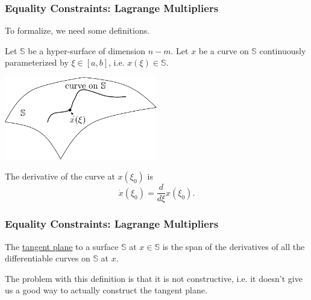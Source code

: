 \documentclass{beamer}
\begin{document}
\begin{frame}\frametitle{Equality Constraints: Lagrange Multipliers}
	To formalize, we need some definitions.
	
	Let $\mathbb{S}$ be a hyper-surface of dimension $n-m$.  Let $x$ be a curve on $\mathbb{S}$ continuously parameterized by $\xi \in [a,b]$, i.e. $x(\xi) \in \mathbb{S}$.
	
	\begin{center}
		\includegraphics[width=0.5\textwidth]
			{figures/chap18_curve_on_S}
	\end{center}
	
	The derivative of the curve at $x(\xi_0)$ is 
	\[
		\dot{x}(\xi_0) = \frac{d}{d\xi}x(\xi_0).
	\]	
\end{frame}

\begin{frame}\frametitle{Equality Constraints: Lagrange Multipliers}
	\begin{definition}
		The \underline{tangent plane} to a surface $\mathbb{S}$ at $x \in \mathbb{S}$ is the span of the derivatives of all the differentiable curves on $\mathbb{S}$ at $x$.
	\end{definition}
	
	\vfill

	The problem with this definition is that it is not constructive, i.e. it doesn't give us a good way to actually construct the tangent plane.
	
\end{frame}
\end{document}
